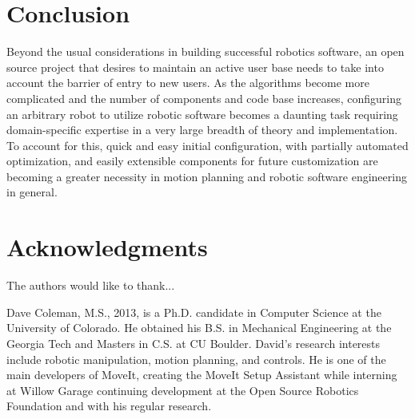 \documentclass[10pt,journal,compsoc]{joser1}
\begin{document}
{%
\section{Conclusion}

Beyond the usual considerations in building successful robotics software, an open source project that desires to maintain an active user base needs to take into account the barrier of entry to new users. As the algorithms become more complicated and the number of components and code base increases, configuring an arbitrary robot to utilize robotic software becomes a daunting task requiring domain-specific expertise in a very large breadth of theory and implementation. To account for this, quick and easy initial configuration, with partially automated optimization, and easily extensible components for future customization are becoming a greater necessity in motion planning and robotic software engineering in general. 

\section*{Acknowledgments}
The authors would like to thank...





\begin{IEEEbiography}[{coleman}]{Dave Coleman}, M.S., 2013, is a Ph.D. candidate in Computer Science at the University of Colorado. He obtained his B.S. in Mechanical Engineering at the Georgia Tech and Masters in C.S. at CU Boulder. David's research interests include robotic manipulation, motion planning, and controls. He is one of the main developers of MoveIt, creating the MoveIt Setup Assistant while interning at Willow Garage continuing development at the Open Source Robotics Foundation and with his regular research.
\end{IEEEbiography}

}
\end{document}
